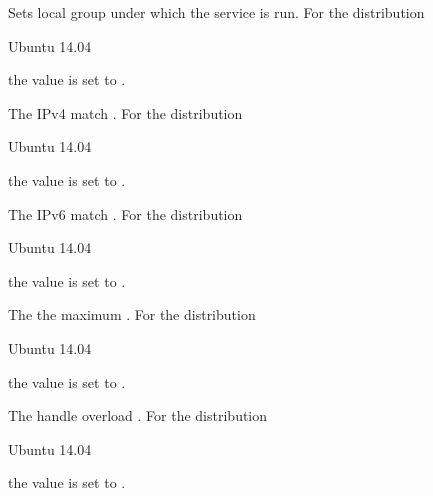 Sets local group  under which the service is run.
For the distribution
\begin{inparaitem}
\item[\TheDistribution{ubuntu}] Ubuntu 14.04
\end{inparaitem}
the value is set to .


The IPv4 match .
For the distribution
\begin{inparaitem}
\item[\TheDistribution{ubuntu}] Ubuntu 14.04
\end{inparaitem}
the value is set to .


The IPv6 match .
For the distribution
\begin{inparaitem}
\item[\TheDistribution{ubuntu}] Ubuntu 14.04
\end{inparaitem}
the value is set to .


The the maximum .
For the distribution
\begin{inparaitem}
\item[\TheDistribution{ubuntu}] Ubuntu 14.04
\end{inparaitem}
the value is set to .


The handle overload .
For the distribution
\begin{inparaitem}
\item[\TheDistribution{ubuntu}] Ubuntu 14.04
\end{inparaitem}
the value is set to .

